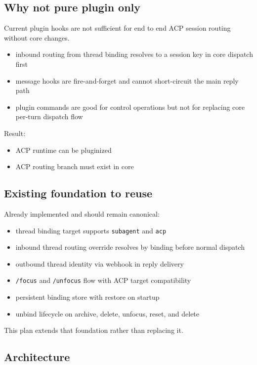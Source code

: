 \subsection{Why not pure plugin only}


Current plugin hooks are not sufficient for end to end ACP session routing without core changes.

\begin{itemize}
  \item inbound routing from thread binding resolves to a session key in core dispatch first
  \item message hooks are fire-and-forget and cannot short-circuit the main reply path
  \item plugin commands are good for control operations but not for replacing core per-turn dispatch flow
\end{itemize}


Result:

\begin{itemize}
  \item ACP runtime can be pluginized
  \item ACP routing branch must exist in core
\end{itemize}


\subsection{Existing foundation to reuse}


Already implemented and should remain canonical:

\begin{itemize}
  \item thread binding target supports \texttt{subagent} and \texttt{acp}
  \item inbound thread routing override resolves by binding before normal dispatch
  \item outbound thread identity via webhook in reply delivery
  \item \texttt{/focus} and \texttt{/unfocus} flow with ACP target compatibility
  \item persistent binding store with restore on startup
  \item unbind lifecycle on archive, delete, unfocus, reset, and delete
\end{itemize}


This plan extends that foundation rather than replacing it.

\subsection{Architecture}


